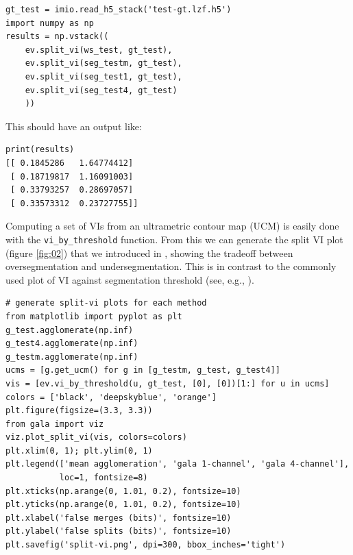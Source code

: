 \documentclass{frontiersSCNS} %
\begin{document}
{\small
\begin{verbatim}
gt_test = imio.read_h5_stack('test-gt.lzf.h5')
import numpy as np
results = np.vstack((
    ev.split_vi(ws_test, gt_test),
    ev.split_vi(seg_testm, gt_test),
    ev.split_vi(seg_test1, gt_test),
    ev.split_vi(seg_test4, gt_test)
    ))
\end{verbatim}
}

This should have an output like:

{\small
\begin{verbatim}
print(results)
[[ 0.1845286   1.64774412]
 [ 0.18719817  1.16091003]
 [ 0.33793257  0.28697057]
 [ 0.33573312  0.23727755]]
 \end{verbatim}
}

Computing a set of VIs from an ultrametric contour map (UCM) \citep{Arbelaez:jg} is easily done with the \texttt{\small vi\_by\_threshold} function.
From this we can generate the split VI plot (figure \ref{fig:02}) that we introduced in \cite{NunezIglesias:2013cd}, showing the tradeoff between oversegmentation and undersegmentation.
This is in contrast to the commonly used plot of VI against segmentation threshold (see, e.g., \cite{Andres:2012vp}).


{\small
\begin{verbatim}
# generate split-vi plots for each method
from matplotlib import pyplot as plt
g_test.agglomerate(np.inf)
g_test4.agglomerate(np.inf)
g_testm.agglomerate(np.inf)
ucms = [g.get_ucm() for g in [g_testm, g_test, g_test4]]
vis = [ev.vi_by_threshold(u, gt_test, [0], [0])[1:] for u in ucms]
colors = ['black', 'deepskyblue', 'orange']
plt.figure(figsize=(3.3, 3.3))
from gala import viz
viz.plot_split_vi(vis, colors=colors)
plt.xlim(0, 1); plt.ylim(0, 1)
plt.legend(['mean agglomeration', 'gala 1-channel', 'gala 4-channel'],
           loc=1, fontsize=8)
plt.xticks(np.arange(0, 1.01, 0.2), fontsize=10)
plt.yticks(np.arange(0, 1.01, 0.2), fontsize=10)
plt.xlabel('false merges (bits)', fontsize=10)
plt.ylabel('false splits (bits)', fontsize=10)
plt.savefig('split-vi.png', dpi=300, bbox_inches='tight')
\end{verbatim}
}
\end{document}
